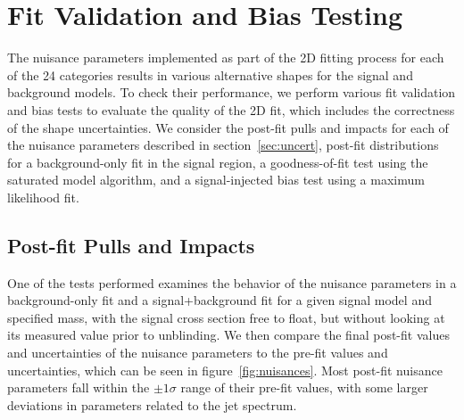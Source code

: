 
\section{Fit Validation and Bias Testing}
\label{sec:bias}

The nuisance parameters implemented as part of the 2D fitting process for each of the 24 categories results in various alternative shapes for the signal and background models.
To check their performance, we perform various fit validation and bias tests to evaluate the quality of the 2D fit, which includes the correctness of the shape uncertainties. %
We consider the post-fit pulls and impacts for each of the nuisance parameters described in section~\ref{sec:uncert}, post-fit distributions for a background-only fit in the signal region, a goodness-of-fit test using the saturated model algorithm, and a signal-injected bias test using a maximum likelihood fit.

\subsection{Post-fit Pulls and Impacts}

One of the tests performed examines the behavior of the nuisance parameters in a background-only fit and a signal+background fit for a given signal model and specified mass, with the signal cross section free to float, but without looking at its measured value prior to unblinding.
We then compare the final post-fit values and uncertainties of the nuisance parameters to the pre-fit values and uncertainties, which can be seen in figure~\ref{fig:nuisances}.
Most post-fit nuisance parameters fall within the $\pm1\sigma$ range of their pre-fit values, with some larger deviations in parameters related to the jet \pt spectrum.

